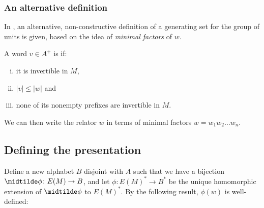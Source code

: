 \documentclass[noindex,noinsetproof,12pt]{lmaths}
\begin{document}
\subsubsection{An alternative definition}

In \cite{Zhang1992}, an alternative, non-constructive definition of a generating set for the group of units is given, based on the idea of \emph{minimal factors} of $w$.

\begin{defn}
	A word $v \in A^+$ is  if:
	\begin{enumerate}[(i)]
		\item it is invertible in $M$,
		\item $|v| \le |w|$ and
		\item none of its nonempty prefixes are invertible in $M$.
	\end{enumerate}
\end{defn}

We can then write the relator $w$ in terms of minimal factors $w = w_1w_2\ldots w_n$.


\subsection{Defining the presentation}

Define a new alphabet $B$ disjoint with $A$ such that we have a bijection $\midtilde\phi \colon E(M) \to B$, and let $\phi \colon E(M)^* \to B^*$ be the unique homomorphic extension of $\midtilde\phi$ to $E(M)^*$. By the following result, $\phi(w)$ is well-defined:
\end{document}

